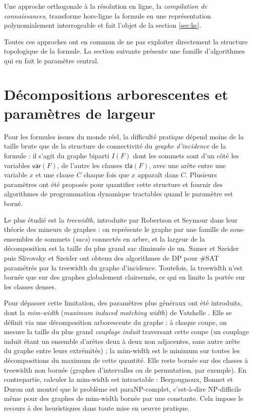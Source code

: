 \documentclass[11pt,a4paper]{report}
\theoremstyle{plain}
\theoremstyle{definition}
\begin{document}
Une approche orthogonale à la résolution en ligne, la \emph{compilation de
connaissances}, transforme hors-ligne la formule en une représentation
polynomialement interrogeable et fait l'objet de la
section \ref{sec:kc}.

Toutes ces approches ont en commun de ne pas exploiter directement la
structure topologique de la formule. La section suivante présente une
famille d'algorithmes qui en fait le paramètre central.

\section{Décompositions arborescentes et paramètres de largeur}
\label{sec:decomp}

Pour les formules issues du monde réel, la difficulté pratique dépend
moins de la taille brute que de la structure de connectivité du
\emph{graphe d'incidence} de la formule : il s'agit du graphe biparti
$I(F)$ dont les sommets sont d'un côté les variables $\mathsf{var}(F)$,
de l'autre les clauses $\mathsf{cla}(F)$, avec une arête entre une
variable $x$ et une clause $C$ chaque fois que $x$ apparaît dans $C$.
Plusieurs paramètres ont été proposés pour quantifier cette structure et
fournir des algorithmes de programmation dynamique tractables quand le
paramètre est borné.

Le plus étudié est la \emph{treewidth}, introduite par Robertson et
Seymour dans leur théorie des mineurs de graphes : on représente le
graphe par une famille de sous-ensembles de sommets (\emph{sacs})
connectés en arbre, et la largeur de la décomposition est la taille
du plus grand sac diminuée de un. Samer et Szeider \cite{samer2010}
puis Slivovsky et Szeider \cite{slivovsky2020} ont obtenu des algorithmes
de DP pour \#SAT paramétrés par la treewidth du graphe d'incidence.
Toutefois, la treewidth n'est bornée que sur des graphes globalement
clairsemés, ce qui en limite la portée sur les classes denses.

Pour dépasser cette limitation, des paramètres plus généraux ont été
introduits, dont la \emph{mim-width} (\emph{maximum induced
matching width}) de Vatshelle \cite{vatshelle2012}. Elle se définit
via une décomposition arborescente du graphe : à chaque coupe, on
mesure la taille du plus grand \emph{couplage induit} traversant
cette coupe (un couplage induit étant un ensemble d'arêtes deux à deux
non adjacentes, sans autre arête du graphe entre leurs extrémités) ;
la mim-width est le minimum sur toutes les décompositions du maximum
de cette quantité. Elle reste bornée sur des classes à treewidth non
bornée (graphes d'intervalles ou de permutation, par exemple). En
contrepartie, calculer la mim-width est intractable : Bergougnoux,
Bonnet et Duron \cite{bergougnoux2025} ont montré que le problème est
paraNP-complet, c'est-à-dire NP-difficile même pour des graphes de
mim-width bornée par une constante. Cela impose le recours à des
heuristiques dans toute mise en oeuvre pratique.
\end{document}
